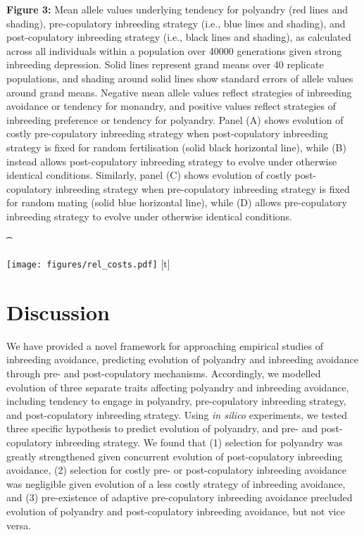 \documentclass[10pt,letterpaper]{article}
\begin{document}
{\color{Gray}
\begin{adjustwidth}{-2.5in}{0in}
{%
   \begin{justify}\vspace{0.25 mm} \textbf{Figure 3:} Mean allele values underlying tendency for polyandry (red lines and shading), pre-copulatory inbreeding strategy (i.e., blue lines and shading), and post-copulatory inbreeding strategy (i.e., black lines and shading), as calculated across all individuals within a population over 40000 generations given strong inbreeding depression. Solid lines represent grand means over 40 replicate populations, and shading around solid lines show standard errors of allele values around grand means. Negative mean allele values reflect strategies of inbreeding avoidance or tendency for monandry, and positive values reflect strategies of inbreeding preference or tendency for polyandry. Panel (A) shows evolution of costly pre-copulatory inbreeding strategy when post-copulatory inbreeding strategy is fixed for random fertilisation (solid black horizontal line), while (B) instead allows post-copulatory inbreeding strategy to evolve under otherwise identical conditions. Similarly, panel (C) shows evolution of costly post-copulatory inbreeding strategy when pre-copulatory inbreeding strategy is fixed for random mating (solid blue horizontal line), while (D) allows pre-copulatory inbreeding strategy to evolve under otherwise identical conditions.\end{justify}{\t}%
}
{%
   \texttt{[image: figures/rel\_costs.pdf]}%
}%
[t]
\end{adjustwidth}
}


\section*{Discussion}

We have provided a novel framework for approaching empirical studies of inbreeding avoidance, predicting evolution of polyandry and inbreeding avoidance through pre- and post-copulatory mechanisms. Accordingly, we modelled evolution of three separate traits affecting polyandry and inbreeding avoidance, including tendency to engage in polyandry, pre-copulatory inbreeding strategy, and post-copulatory inbreeding strategy. Using \textit{in silico} experiments, we tested three specific hypothesis to predict evolution of polyandry, and pre- and post-copulatory inbreeding strategy. We found that (1) selection for polyandry was greatly strengthened given concurrent evolution of post-copulatory inbreeding avoidance, (2) selection for costly pre- or post-copulatory inbreeding avoidance was negligible given evolution of a less costly strategy of inbreeding avoidance, and (3) pre-existence of adaptive pre-copulatory inbreeding avoidance precluded evolution of polyandry and post-copulatory inbreeding avoidance, but not vice versa.
\end{document}
